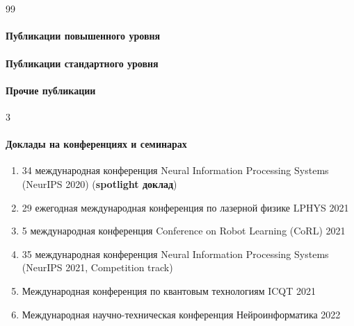 \ifresume 

\section*{}

\expandafter\def\csname blx@maxbibnames\endcsname{99}%
\paragraph{Публикации повышенного уровня} 
\begin{refsection} 
    \nocite{confbib1}
    \printbibliography[heading=none]
\end{refsection}

\paragraph{Публикации стандартного уровня}
\begin{refsection} 
    \nocite{confbib4}
    \printbibliography[heading=none]
\end{refsection}

\paragraph{Прочие публикации}
\begin{refsection} 
    \nocite{confbib2}
    \nocite{confbib3}
    \nocite{progbib1}
    \printbibliography[heading=none]
\end{refsection}

\expandafter\def\csname blx@maxbibnames\endcsname{3}%

\paragraph{Доклады на конференциях и семинарах}
\begin{enumerate}[labelindent=3pt, labelsep=10pt, topsep=10pt, itemsep=5pt]
    \item 34 международная конференция Neural Information Processing Systems (NeurIPS 2020) (\textbf{spotlight доклад})
    \item 29 ежегодная международная конференция по лазерной физике LPHYS 2021
    \item 5 международная конференция Conference on Robot Learning (CoRL) 2021
    \item 35 международная конференция Neural Information Processing Systems (NeurIPS 2021, Competition track)
    \item Международная конференция по квантовым технологиям ICQT 2021
    \item Международная научно-техническая конференция Нейроинформатика 2022
\end{enumerate}

